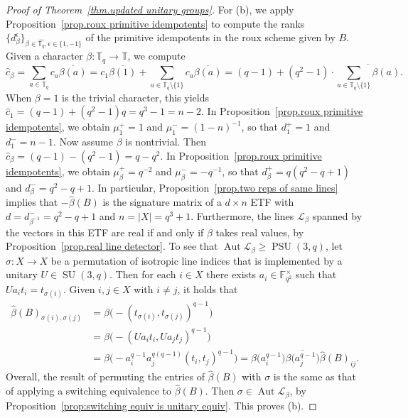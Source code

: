 \documentclass[11pt]{article}
\theoremstyle{definition}
\numberwithin{equation}{section}
\begin{document}
\begin{proof}[Proof of Theorem~\ref{thm.updated unitary groups}]
For (b), we apply Proposition~\ref{prop.roux primitive idempotents} to compute the ranks $\{ d_\beta^\epsilon \}_{\beta \in \hat{\mathbb{T}_q}, \epsilon \in \{1,-1\}}$ of the primitive idempotents in the roux scheme given by $B$.
Given a character $\beta \colon \mathbb{T}_q \to \mathbb{T}$, we compute
\[
\hat{c}_{\beta} = \sum_{a \in \mathbb{T}_q} c_a \overline{\beta(a)}
= c_1 \overline{\beta(1)} + \sum_{a \in \mathbb{T}_q \setminus \{1\} } c_a \overline{\beta(a)}
= (q-1) + (q^2-1) \cdot \overline{ \sum_{a\in \mathbb{T}_q \setminus\{1\} } \beta(a) }.
\]
When $\beta=1$ is the trivial character, this yields $\hat{c}_1 = (q-1) + (q^2-1)q = q^3-1 = n-2$.
In Proposition~\ref{prop.roux primitive idempotents}, we obtain $\mu_1^+ = 1$ and $\mu_1^- = (1-n)^{-1}$, so that $d_1^+ = 1$ and $d_1^- = n-1$.
Now assume $\beta$ is nontrivial.
Then $\hat{c}_{\beta} = (q-1) - (q^2-1) = q - q^2$.
In Proposition~\ref{prop.roux primitive idempotents}, we obtain $\mu_\beta^+ = q^{-2}$ and $\mu_\beta^- = -q^{-1}$, so that $d_\beta^+ = q(q^2-q+1)$ and $d_\beta^- = q^2-q+1$.
In particular, Proposition~\ref{prop.two reps of same lines} implies that $- \hat{\beta}(B)$ is the signature matrix of a $d\times n$ ETF with $d = d_{\beta^{-1}}^- = q^2-q+1$ and $n = |X| = q^3+1$.
Furthermore, the lines $\mathscr{L}_\beta$ spanned by the vectors in this ETF are real if and only if $\beta$ takes real values, by Proposition~\ref{prop.real line detector}.
To see that $\operatorname{Aut} \mathscr{L}_\beta \geq \operatorname{PSU}(3,q)$, let $\sigma \colon X \to X$ be a permutation of isotropic line indices that is implemented by a unitary $U \in \operatorname{SU}(3,q)$.
Then for each $i \in X$ there exists $a_i \in \mathbb{F}_{q^2}^\times$ such that $U a_i t_i = t_{\sigma(i)}$.
Given $i,j \in X$ with $i \neq j$, it holds that 
\begin{align*}
\hat{\beta}(B)_{\sigma(i),\sigma(j)} &= \beta \bigl( - (t_{\sigma(i)},t_{\sigma(j)})^{q-1} \bigr) \\
&= \beta \bigl( - (U a_i t_i, U a_j t_j)^{q-1} \bigr) \\
&= \beta \bigl( - a_i^{q-1} a_j^{q(q-1)} (t_i, t_j)^{q-1} \bigr)
= \beta\bigl(a_i^{q-1}\bigr) \overline{\beta\bigl(a_j^{q-1}\bigr)} \hat{\beta}(B)_{ij}.
\end{align*}
Overall, the result of permuting the entries of $\hat{\beta}(B)$ with $\sigma$ is the same as that of applying a switching equivalence to $\hat{\beta}(B)$.
Then $\sigma \in \operatorname{Aut} \mathscr{L}_\beta$, by Proposition~\ref{prop:switching equiv is unitary equiv}.
This proves (b).


\end{proof}
\end{document}
